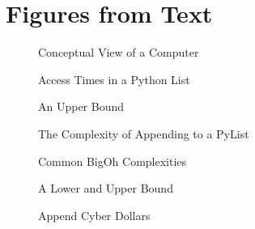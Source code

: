 \documentclass[letterpaper,10pt,english]{sphinxmanual}
\begin{document}
\section{Figures from Text}
\label{\detokenize{chap2/chap2:figures-from-text}}
\begin{figure}[htbp]
\centering
\capstart

\noindent{}
\caption{Conceptual View of a Computer}\label{\detokenize{chap2/chap2:id1}}\end{figure}

\begin{figure}[htbp]
\centering
\capstart

\noindent{}
\caption{Access Times in a Python List}\label{\detokenize{chap2/chap2:id2}}\end{figure}

\begin{figure}[htbp]
\centering
\capstart

\noindent{}
\caption{An Upper Bound}\label{\detokenize{chap2/chap2:id3}}\end{figure}

\begin{figure}[htbp]
\centering
\capstart

\noindent{}
\caption{The Complexity of Appending to a PyList}\label{\detokenize{chap2/chap2:id4}}\end{figure}

\begin{figure}[htbp]
\centering
\capstart

\noindent{}
\caption{Common Big\sphinxhyphen{}Oh Complexities}\label{\detokenize{chap2/chap2:id5}}\end{figure}

\begin{figure}[htbp]
\centering
\capstart

\noindent{}
\caption{A Lower and Upper Bound}\label{\detokenize{chap2/chap2:id6}}\end{figure}

\begin{figure}[htbp]
\centering
\capstart

\noindent{}
\caption{Append Cyber Dollars}\label{\detokenize{chap2/chap2:id7}}\end{figure}
\end{document}
